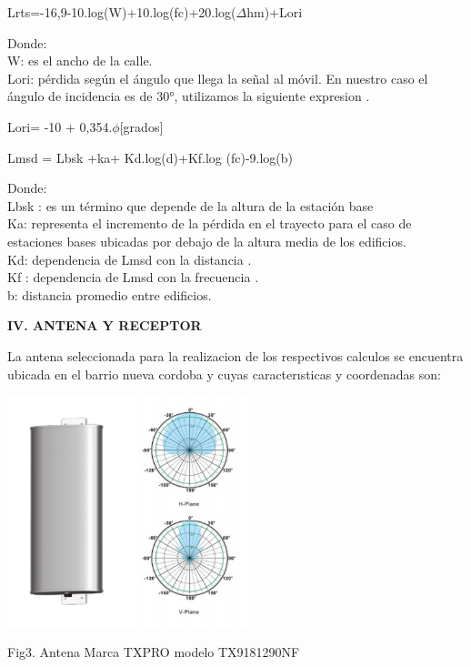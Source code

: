 \documentclass[conference, 9pt, a4paper]{IEEEtran}
\begin{document}
\begin{center}
Lrts=-16,9-10.log(W)+10.log(fc)+20.log($\Delta $hm)+Lori
\end{center}
Donde:\\
W: es el ancho de la calle.\\
Lori: pérdida según el ángulo que llega la señal al móvil.
En nuestro caso el ángulo de incidencia es de  30°, utilizamos la siguiente expresion .\\
\begin{center}
Lori= -10 + 0,354.$\phi$[grados]
\end{center}
\begin{center}
Lmsd = Lbsk +ka+ Kd.log(d)+Kf.log (fc)-9.log(b)
\end{center}
Donde:\\
Lbsk : es un término que depende de la altura de la estación
base\\
Ka: representa el incremento de la pérdida en el trayecto
para el caso de estaciones bases ubicadas por debajo de la
altura media de los edificios.\\
Kd: dependencia de Lmsd con la distancia .\\
Kf : dependencia de Lmsd con la frecuencia . \\ 
b:  distancia promedio entre edificios. \\
\begin{center}
\textbf{IV. ANTENA Y RECEPTOR }
\end{center}

La antena seleccionada para la realizacion de los respectivos
calculos se encuentra ubicada en el barrio nueva cordoba y cuyas caracterısticas y coordenadas son: 


\begin{center}
\includegraphics[width=7cm]{image/ANTENA.PNG} 
\end{center}
\begin{center}
Fig3. Antena  Marca TXPRO modelo TX9181290NF
\end{center}
\end{document}
